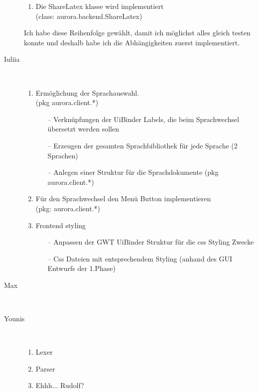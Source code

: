 \documentclass[parskip=full,11pt,twoside]{scrartcl}
\begin{document}
\begin{description}
\begin{enumerate}
\item Die ShareLatex klasse wird implementiert \\(class: aurora.backend.ShareLatex)
    \end{enumerate}
Ich habe diese Reihenfolge gewählt, damit ich möglichst alles gleich testen konnte und deshalb habe ich die Abhängigkeiten zuerst implementiert.
    \item [Iuliia]\hfill \\
    
   
    \begin{enumerate}
    
    
    \item Ermöglichung der Sprachauswahl.  \\(pkg aurora.client.*)
    
    \begin{itemize}
    
	\item[--] Verknüpfungen der UiBinder Labels, die beim Sprachwechsel übersetzt werden sollen
	
	\item[--] Erzeugen der gesamten Sprachbibliothek für jede Sprache (2 Sprachen)
	
	\item[--] Anlegen einer Struktur für die Sprachdokumente (pkg aurora.client.*)
	
    \end{itemize}
    
    \item Für den Sprachwechsel den Menü Button implementieren \\(pkg: aurora.client.*)
    
    \item Frontend styling
    
    \begin{itemize}
    
	\item[--] Anpassen der GWT UiBinder Struktur für die css Styling Zwecke
	
	\item[--] Css Dateien mit entsprechendem Styling (anhand des GUI Entwurfs der 1.Phase)

    \end{itemize}
    
    \end{enumerate}
    
    \item [Max]\hfill \\
    \item [Younis]\hfill \\
	\begin{enumerate}
		\item Lexer
		\item Parser
		\item Ehhh... Rudolf?
	\end{enumerate}
    

\end{description}
\end{document}
